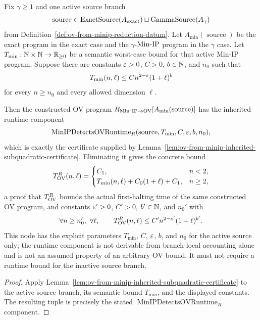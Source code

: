 \begin{lemma}
  \label{lem:min-ip-detects-ov-inherited-runtime-component}
  Fix $\gamma\geq1$ and one active source branch
  \[
    \operatorname{source}\in
      \operatorname{ExactSource}(A_{\rm exact})
      \sqcup
      \operatorname{GammaSource}(A_{\gamma})
  \]
  from Definition~\ref{def:ov-from-minip-reduction-datum}.  Let
  $A_{\min}(\operatorname{source})$ be the exact program in the exact case and
  the $\gamma$-$\mathrm{Min\mbox{-}IP}$ program in the $\gamma$ case.  Let
  $T_{\min}:\mathbb{N}\times\mathbb{N}\to\mathbb{R}_{\geq0}$ be a semantic worst-case bound for that
  active Min-IP program.  Suppose
  there are constants $\varepsilon>0$, $C>0$, $b\in\mathbb{N}$, and $n_0$ such that
  \[
    T_{\min}(n,\ell)\leq C n^{2-\varepsilon}(1+\ell)^b
  \]
  for every $n\geq n_0$ and every allowed dimension $\ell$.

  Then the constructed OV program
  $R_{\mathrm{Min\mbox{-}IP}\to\mathrm{OV}}[A_{\min}(\operatorname{source})]$ has the inherited
  runtime component
  \[
    \operatorname{MinIPDetectsOVRuntime}_R
      (\operatorname{source},T_{\min},C,\varepsilon,b,n_0),
  \]
  which is exactly the certificate supplied by
  Lemma~\ref{lem:ov-from-minip-inherited-subquadratic-certificate}.  Eliminating
  it gives the concrete bound
  \[
    T_{\mathrm{OV}}^R(n,\ell)=
    \begin{cases}
      C_1, & n<2,\\
      T_{\min}(n,\ell)+C_0(1+\ell)+C_1, & n\geq2,
    \end{cases}
  \]
  a proof that $T_{\mathrm{OV}}^R$ bounds the actual first-halting time of the same
  constructed OV program, and constants
  $\varepsilon'>0$, $C'>0$, $b'\in\mathbb{N}$, and $n_0'$ with
  \[
    \forall n\geq n_0',\ \forall\ell,\qquad
      T_{\OV}^R(n,\ell)\leq C'n^{2-\eps'}(1+\ell)^{b'}.
  \]
  This node has the explicit parameters $T_{\min}$, $C$, $\varepsilon$, $b$, and
  $n_0$ for the active source only; the runtime component is not derivable
  from branch-local accounting alone and is not an assumed property of an
  arbitrary OV bound.  It must not require a runtime bound for the inactive
  source branch.
\end{lemma}
\begin{proof}
  Apply Lemma~\ref{lem:ov-from-minip-inherited-subquadratic-certificate} to the
  active source branch, its semantic bound $T_{\min}$, and the displayed
  constants.  The resulting tuple is precisely the stated
  $\operatorname{MinIPDetectsOVRuntime}_R$ component.
\end{proof}

